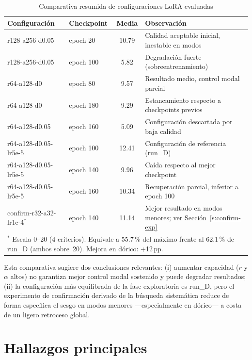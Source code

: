 \documentclass[%
    school=etsisi,%
    type=pfg,%
    degree=61CD,%
]{upm-report}
\begin{document}
\begin{table}[htbp]
    \centering
    \caption{Comparativa resumida de configuraciones LoRA evaluadas}
    \label{tab:comparativa-runs}
    \small
    \begin{tabular}{p{3.8cm}lcp{4.8cm}}
        \toprule
        \textbf{Configuraci\'on} & \textbf{Checkpoint} & \textbf{Media} & \textbf{Observaci\'on} \\
        \midrule
        r128-a256-d0.05 & epoch 20  & 10.79 & Calidad aceptable inicial, inestable en modos \\
        r128-a256-d0.05 & epoch 100 & 5.82  & Degradaci\'on fuerte (sobreentrenamiento) \\
        r64-a128-d0     & epoch 80  & 9.57  & Resultado medio, control modal parcial \\
        r64-a128-d0     & epoch 180 & 9.29  & Estancamiento respecto a checkpoints previos \\
        r64-a128-d0.05  & epoch 160 & 5.09  & Configuraci\'on descartada por baja calidad \\
        r64-a128-d0.05-lr5e-5 & epoch 100 & 12.41 & Configuraci\'on de referencia (run\_D) \\
        r64-a128-d0.05-lr5e-5 & epoch 140 & 9.96  & Ca\'ida respecto al mejor checkpoint \\
        r64-a128-d0.05-lr5e-5 & epoch 160 & 10.34 & Recuperaci\'on parcial, inferior a epoch 100 \\
        \midrule
        confirm-r32-a32-lr1e-4$^{*}$ & epoch 140 & 11.14 & Mejor resultado en modos menores; ver Secci\'on~\ref{s:confirm-exp} \\
        \bottomrule
        \multicolumn{4}{p{13cm}}{$^{*}$ Escala 0--20 (4 criterios). Equivale a 55.7\,\% del m\'aximo frente al 62.1\,\% de run\_D (ambos sobre~20). Mejora en d\'orico: +12\,pp.}
    \end{tabular}
\end{table}

Esta comparativa sugiere dos conclusiones relevantes: (i) aumentar capacidad ($r$ y $\alpha$ altos) no garantiza mejor control modal sostenido y puede degradar resultados; (ii) la configuraci\'on m\'as equilibrada de la fase exploratoria es run\_D, pero el experimento de confirmaci\'on derivado de la b\'usqueda sistem\'atica reduce de forma espec\'ifica el sesgo en modos menores ---especialmente en d\'orico--- a costa de un ligero retroceso global.

\section{Hallazgos principales}
\end{document}
